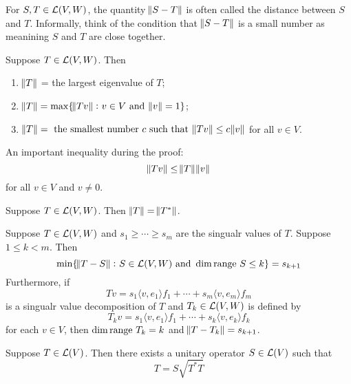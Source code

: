 \documentclass{extarticle}
\begin{document}
\begin{remark}
    For \(S, T \in \mathcal{L}(V, W)\), the quantity \(\norm{S - T}\) is often called the distance between 
    \(S\) and \(T\). Informally, think of the condition that \(\norm{S - T}\) is a small number 
    as meanining \(S\) and \(T\) are close together. 
\end{remark}


\begin{thm}
    Suppose \(T \in \mathcal{L}(V, W)\). Then 
    \begin{enumerate}[label=(\alph*)]
        \item \(\norm{T}\) = the largest eigenvalue of \(T\); 
        \item \(\norm{T} = \max \{\norm{Tv} \colon v \in V \text{ and } \norm{v} = 1\} \); 
        \item \(\norm{T} = \text{ the smallest number } c \text{ such that } \norm{Tv} \leq c \norm{v}\) 
        for all \(v \in V\).
    \end{enumerate}
\end{thm}

\begin{remark}
    An important inequality during the proof:
    \[\norm{Tv} \leq \norm{T} \norm{v}\]
    for all \(v \in V\) and \(v \neq 0\). 
\end{remark}

\begin{corollary}
    Suppose \(T \in \mathcal{L}(V, W)\). Then \(\norm{T} = \norm{T^*}\).
\end{corollary}

\begin{thm}
Suppose \(T \in \mathcal{L}(V, W)\) and \(s_1 \geq \cdots \geq s_m\) are the singualr 
values of \(T\). Suppose \(1 \leq k < m\). Then 
\[\min \{\norm{T - S} \colon S \in \mathcal{L}(V, W) \text{ and } 
\dim \text{range } S \leq k\} = s_{k+1}\]
Furthermore, if 
\[Tv = s_1 \langle v,e_1 \rangle f_1 + \cdots + s_m \langle v,e_m \rangle f_m\]
is a singualr value decomposition of \(T\) and \(T_k \in \mathcal{L}(V, W)\) is 
defined by 
\[T_k v = s_1 \langle v,e_1 \rangle f_1 + \cdots + s_k \langle v,e_k \rangle f_k\]
for each \(v \in V\), then \(\dim \text{range } T_k = k\) and \(\norm{T - T_k} = s_{k+1}\).
\end{thm}

\begin{thm}
    Suppose \(T \in \mathcal{L}(V)\). Then there exists a unitary operator 
    \(S \in \mathcal{L}(V)\) such that 
    \[T = S \sqrt{T^* T}\]
\end{thm}
\end{document}
